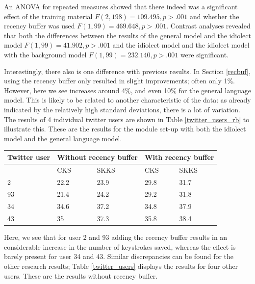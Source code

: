 \documentclass[11pt]{article}
\let\originaltable\table
\let\endoriginaltable\endtable
\renewenvironment{table}[1][ht]{%
  \originaltable[#1]
  \centering}%
  {\endoriginaltable}
\begin{document}
An ANOVA for repeated measures showed that there indeed was a significant effect of the training material $F(2,198) = 109.495, p > .001$ and whether the recency buffer was used $F(1,99) = 469.648, p > .001$. Contrast analyses revealed that both the differences between the results of the general model and the idiolect model $F(1,99) = 41.902, p > .001$ and the idiolect model and the idiolect model with the background model $F(1,99) = 232.140, p > .001$ were significant.

Interestingly, there also is one difference with previous results. In Section \ref{recbuf}, using the recency buffer only resulted in slight improvements; often only 1\%. However, here we see increases around 4\%, and even 10\% for the general language model. This is likely to be related to another characteristic of the data: as already indicated by the relatively high standard deviations, there is a lot of variation. The results of 4 individual twitter users are shown in Table \ref{twitter_users_rb} to illustrate this. These are the results for the module set-up with both the idiolect model and the general language model.

\begin{table}[H] 
\centering
\begin{tabular}{l|llll} 
Twitter user&\multicolumn{2}{l}{Without recency buffer}&\multicolumn{2}{l}{With recency buffer}\\
\hline
&CKS&SKKS&CKS&SKKS\\
2&22.2&23.9&29.8&31.7\\
93&21.4&24.2&29.2&31.8\\
34&34.6&37.2&34.8&37.9\\
43&35&37.3&35.8&38.4\\
\end{tabular} 
\caption{Percentage of keystrokes saved for 4 individual Twitter users, with and without the recency buffer} \label{twitter_users_rb}
\end{table}

Here, we see that for user 2 and 93 adding the recency buffer results in an considerable increase in the number of keystrokes saved, whereas the effect is barely present for user 34 and 43. Similar discrepancies can be found for the other research results; Table \ref{twitter_users} displays the results for four other users. These are the results without recency buffer.
\end{document}
